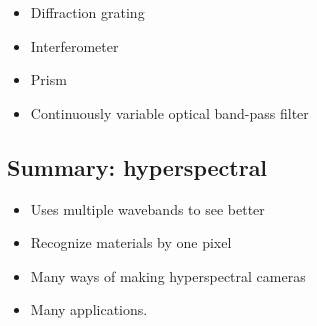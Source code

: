 	\begin{itemize}
		\item Diffraction grating
		\item Interferometer
		\item Prism
		\item Continuously variable optical band-pass filter
	\end{itemize}

	\subsection*{Summary: hyperspectral}
	\begin{itemize}
		\item Uses multiple wavebands to see better
		\item Recognize materials by one pixel
		\item Many ways of making hyperspectral cameras
		\item Many applications. 
	\end{itemize}
	
	
	